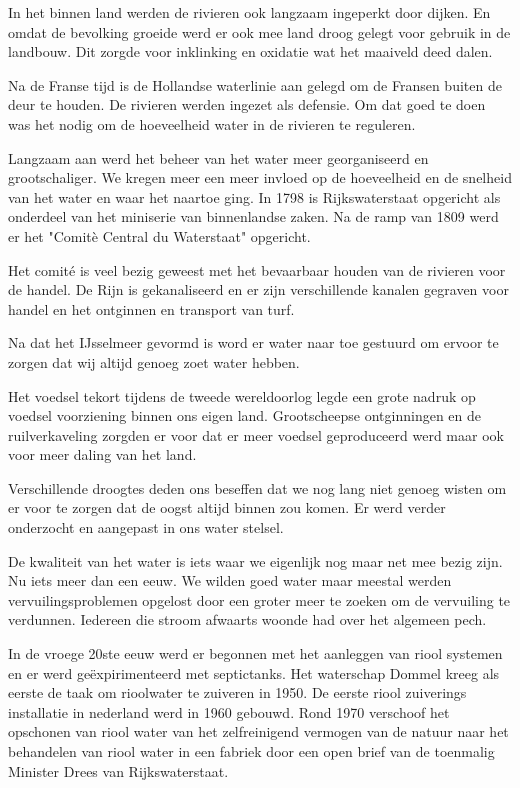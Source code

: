 In het binnen land werden de rivieren ook langzaam ingeperkt door dijken.
En omdat de bevolking groeide werd er ook mee land droog gelegt voor gebruik in de landbouw.
Dit zorgde voor inklinking en oxidatie wat het maaiveld deed dalen.

Na de Franse tijd is de Hollandse waterlinie aan gelegd om de Fransen buiten de deur te houden.
De rivieren werden ingezet als defensie.
Om dat goed te doen was het nodig om de hoeveelheid water in de rivieren te reguleren.

Langzaam aan werd het beheer van het water meer georganiseerd en grootschaliger.
We kregen meer een meer invloed op de hoeveelheid en de snelheid van het water en waar het naartoe ging.
In 1798 is Rijkswaterstaat opgericht als onderdeel van het miniserie van binnenlandse zaken.
Na de ramp van 1809 werd er het "Comit\`e Central du Waterstaat" opgericht.

Het comité is veel bezig geweest met het bevaarbaar houden van de rivieren voor de handel.
De Rijn is gekanaliseerd en er zijn verschillende kanalen gegraven voor handel en het ontginnen en transport van turf.

Na dat het IJsselmeer gevormd is word er water naar toe gestuurd om ervoor te zorgen dat wij altijd genoeg zoet water hebben.

Het voedsel tekort tijdens de tweede wereldoorlog legde een grote nadruk op voedsel voorziening binnen ons eigen land.
Grootscheepse ontginningen en de ruilverkaveling zorgden er voor dat er meer voedsel geproduceerd werd maar ook voor meer daling van het land.

Verschillende droogtes deden ons beseffen dat we nog lang niet genoeg wisten om er voor te zorgen dat de oogst altijd binnen zou komen.
Er werd verder onderzocht en aangepast in ons water stelsel.

De kwaliteit van het water is iets waar we eigenlijk nog maar net mee bezig zijn.
Nu iets meer dan een eeuw.
We wilden goed water maar meestal werden vervuilingsproblemen opgelost door een groter meer te zoeken om de vervuiling te verdunnen.
Iedereen die stroom afwaarts woonde had over het algemeen pech.

In de vroege 20ste eeuw werd er begonnen met het aanleggen van riool systemen en er werd ge\"expirimenteerd met septictanks.
Het waterschap Dommel kreeg als eerste de taak om rioolwater te zuiveren in 1950.
De eerste riool zuiverings installatie in nederland werd in 1960 gebouwd.
Rond 1970 verschoof het opschonen van riool water van het zelfreinigend vermogen van de natuur naar het behandelen van riool water in een fabriek door een open brief van de toenmalig Minister Drees van Rijkswaterstaat.

